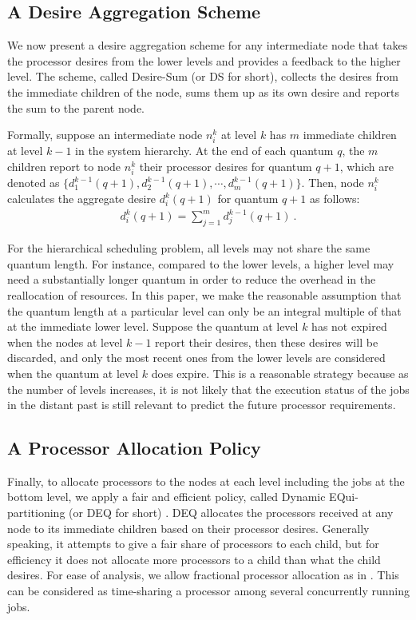 \documentclass[10pt, a4paper]{article}
\begin{document}
\subsection{A Desire Aggregation Scheme}

We now present a desire aggregation scheme for any intermediate node that takes the processor
desires from the lower levels and provides a feedback to the higher level. The scheme, called
Desire-Sum (or DS for short), collects the desires from the immediate children of the node, sums
them up as its own desire and  reports the sum to the parent node.

Formally, suppose an intermediate node $n_i^k$ at level $k$ has $m$ immediate children at level
$k-1$ in the system hierarchy. At the end of each quantum $q$, the $m$ children report to node
$n_i^k$ their processor desires for quantum $q+1$, which are denoted as $\{d_{1}^{k-1}(q+1),
d_{2}^{k-1}(q+1), \cdots, d_{m}^{k-1}(q+1)\}$. Then, node $n_i^k$ calculates the aggregate desire
$d_i^k(q+1)$ for quantum $q+1$ as follows:
\begin{eqnarray}
d_i^k(q+1) = \sum_{j=1}^{m}d_{j}^{k-1}(q+1) \ .
\end{eqnarray}

For the hierarchical scheduling problem, all levels may not share the same quantum length. For
instance, compared to the lower levels, a higher level may need a substantially longer quantum in
order to reduce the overhead in the reallocation of resources. In this paper, we make the
reasonable assumption that the quantum length at a particular level can only be an integral
multiple of that at the immediate lower level. Suppose the quantum at level $k$ has not expired
when the nodes at level $k-1$ report their desires, then these desires will be discarded, and only
the most recent ones from the lower levels are considered when the quantum at level $k$ does
expire. This is a reasonable strategy because as the number of levels increases, it is not likely
that the execution status of the jobs in the distant past is still relevant to predict the future
processor requirements.

\subsection{A Processor Allocation Policy}

Finally, to allocate processors to the nodes at each level including the jobs at the bottom level,
we apply a fair and efficient policy, called Dynamic EQui-partitioning (or DEQ for short)
\cite{McCannVaZa93}. DEQ allocates the processors received at any node to its immediate children
based on their processor desires. Generally speaking, it attempts to give a fair share of
processors to each child, but for efficiency it does not allocate more processors to a child than
what the child desires. For ease of analysis, we allow fractional processor allocation as in
\cite{HeHsLe06,HeHsLe08,SunCaHs11,AgrawalLeHe08,SunCaHs09}. This can be considered as time-sharing
a processor among several concurrently running jobs.
\end{document}
